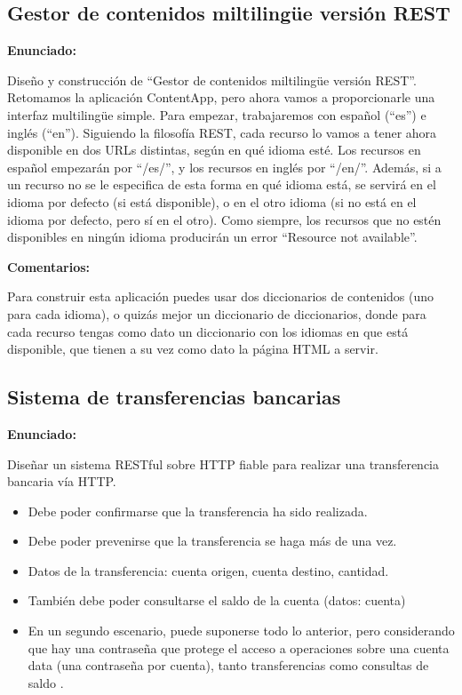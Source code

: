 \subsection{Gestor de contenidos miltilingüe versión REST}
\label{subsec:contentappmulti}

\textbf{Enunciado:}

Diseño y construcción de ``Gestor de contenidos miltilingüe versión REST''. Retomamos la aplicación ContentApp, pero ahora vamos a proporcionarle una interfaz multilingüe simple. Para empezar, trabajaremos con español (``es'') e inglés (``en''). Siguiendo la filosofía REST, cada recurso lo vamos a tener ahora disponible en dos URLs distintas, según en qué idioma esté. Los recursos en español empezarán por ``/es/'', y los recursos en inglés por ``/en/''. Además, si a un recurso no se le especifica de esta forma en qué idioma está, se servirá en el idioma por defecto (si está disponible), o en el otro idioma (si no está en el idioma por defecto, pero sí en el otro). Como siempre, los recursos que no estén disponibles en ningún idioma producirán un error ``Resource not available''.

\textbf{Comentarios:}

Para construir esta aplicación puedes usar dos diccionarios de contenidos (uno para cada idioma), o quizás mejor un diccionario de diccionarios, donde para cada recurso tengas como dato un diccionario con los idiomas en que está disponible, que tienen a su vez como dato la página HTML a servir.


\subsection{Sistema de transferencias bancarias}
\label{subsec:transferencias-bancarias}

\textbf{Enunciado:}

Diseñar un sistema RESTful sobre HTTP fiable para realizar una transferencia bancaria vía HTTP.

\begin{itemize}
\item Debe poder confirmarse que la transferencia ha sido realizada.
\item Debe poder prevenirse que la transferencia se haga más de una vez.
\item Datos de la transferencia: cuenta origen, cuenta destino, cantidad.
\item También debe poder consultarse el saldo de la cuenta (datos: cuenta)
\item En un segundo escenario, puede suponerse todo lo anterior, pero considerando que hay una contraseña que protege el acceso a operaciones sobre una cuenta data (una contraseña por cuenta), tanto transferencias como consultas de saldo
.
\end{itemize}

